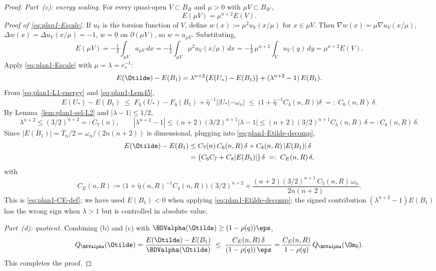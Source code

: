\begin{proof}
\emph{Part~(c): energy scaling.} For every quasi-open
$V\subset B_R$ and $\mu>0$ with $\mu V\subset B_{R'}$,
\begin{equation}\label{eq:plan1-Escale}
E(\mu V)=\mu^{n+2}E(V).
\end{equation}
\emph{Proof of \eqref{eq:plan1-Escale}.} If $u_V$ is the torsion
function of $V$, define $w(x):=\mu^{2}u_V(x/\mu)$ for $x\in\mu V$.
Then $\nabla w(x)=\mu\nabla u_V(x/\mu)$, $\Delta w(x)=\Delta u_V(x/\mu)
=-1$, $w=0$ on $\partial(\mu V)$, so $w=u_{\mu V}$. Substituting,
\[
E(\mu V)=-\tfrac12\!\int_{\mu V}u_{\mu V}\,dx
=-\tfrac12\!\int_{\mu V}\mu^{2}u_V(x/\mu)\,dx
=-\tfrac12\,\mu^{n+2}\!\int_V u_V(y)\,dy=\mu^{n+2}E(V).
\]
Apply \eqref{eq:plan1-Escale} with $\mu=\lambda=r_*^{-1}$:
\begin{equation}\label{eq:plan1-Etilde-decomp}
E(\Otilde)-E(B_1)
=\lambda^{n+2}\bigl(E(U_*)-E(B_1)\bigr)
+(\lambda^{n+2}-1)\,E(B_1).
\end{equation}
From \eqref{eq:plan1-L1-energy} and
\eqref{eq:plan1-Lem45},
\[
E(U_*)-E(B_1)
\;\le\;F_{\hat\eta}(U_*)-F_{\hat\eta}(B_1)+\hat\eta^{-1}||U_*|-\omega_n|
\;\le\;\bigl(1+\hat\eta^{-1}C_4(n,R)\bigr)\delta
\;=:\;C_6(n,R)\,\delta.
\]
By Lemma~\ref{lem:plan1-sel-L2} and $|\lambda-1|\le1/2$,
\[
\lambda^{n+2}\le (3/2)^{n+2}=:C_7(n),
\qquad
|\lambda^{n+2}-1|\le (n+2)(3/2)^{n+1}|\lambda-1|
\le (n+2)(3/2)^{n+1}C_5(n,R)\,\delta=:C_8(n,R)\,\delta.
\]
Since $|E(B_1)|=T_n/2=\omega_n/(2n(n+2))$ is dimensional, plugging
into \eqref{eq:plan1-Etilde-decomp},
\begin{align*}
E(\Otilde)-E(B_1)
&\le C_7(n)\,C_6(n,R)\,\delta + C_8(n,R)\,|E(B_1)|\,\delta\\
&= \bigl(C_6 C_7+C_8|E(B_1)|\bigr)\,\delta
\;=:\;C_E(n,R)\,\delta,
\end{align*}
with
\begin{equation}\label{eq:plan1-CE-def}
C_E(n,R):=
\bigl(1+\hat\eta(n,R)^{-1}C_4(n,R)\bigr)\,(3/2)^{n+2}
+\frac{(n+2)(3/2)^{n+1}\,C_5(n,R)\,\omega_n}{2n(n+2)}.
\end{equation}
This is \eqref{eq:plan1-CE-def}; we have used $E(B_1)<0$ when
applying \eqref{eq:plan1-Etilde-decomp}; the signed contribution
$(\lambda^{n+2}-1)E(B_1)$ has the wrong sign when $\lambda>1$ but is
controlled in absolute value.

\emph{Part~(d): quotient.} Combining (b) and (c) with
$\BDValpha(\Otilde)\ge(1-\rho(q))\eps$,
\[
Q_{\BDValpha}(\Otilde)
=\frac{E(\Otilde)-E(B_1)}{\BDValpha(\Otilde)}
\;\le\;\frac{C_E(n,R)\,\delta}{(1-\rho(q))\,\eps}
=\frac{C_E(n,R)}{1-\rho(q)}\,Q_{\BDValpha}(\Om_0).
\]
This completes the proof.
\end{proof}

